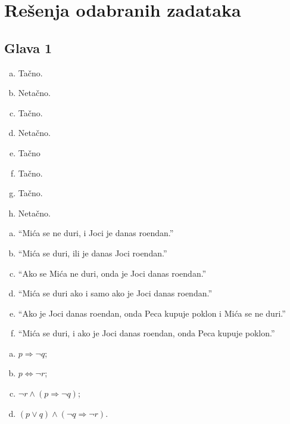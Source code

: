 \chapter{Re\v senja odabranih zadataka}

\section{Glava 1}

\begin{multicols}{4}
\begin{enumerate}[(a)]
\item Ta\v cno.
\item Neta\v cno.
\item Ta\v cno.
\item Neta\v cno.
\item Ta\v cno
\item Ta\v cno.
\item Ta\v cno.
\item Neta\v cno.
\end{enumerate}
\end{multicols}

\begin{enumerate}[(a)]
\item \enquote{Mi\' ca se ne duri, i Joci je danas ro\dj endan.}
\item \enquote{Mi\' ca se duri, ili je danas Joci ro\dj endan.}
\item \enquote{Ako se Mi\' ca ne duri, onda je Joci danas ro\dj endan.}
\item \enquote{Mi\' ca se duri ako i samo ako je Joci danas ro\dj endan.}
\item \enquote{Ako je Joci danas ro\dj endan, onda Peca kupuje poklon i Mi\' ca se ne duri.}
\item \enquote{Mi\' ca se duri, i ako je Joci danas ro\dj endan, onda Peca kupuje poklon.}
\end{enumerate}

\begin{enumerate}[(a)]
\item $p\Rightarrow \neg q$;
\item $p\Leftrightarrow \neg r$;
\item $\neg r\wedge (p\Rightarrow \neg q)$;
\item $(p\vee q)\wedge (\neg q\Rightarrow\neg r)$.
\end{enumerate}


